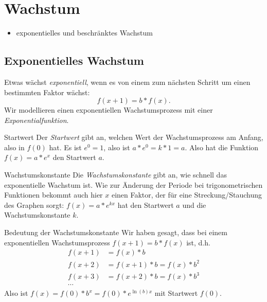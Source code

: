 \chapter{Wachstum}
\begin{inhalt}
  \begin{itemize}
    \item exponentielles und beschränktes Wachstum
  \end{itemize}
\end{inhalt}

\section{Exponentielles Wachstum}

Etwas wächst \emph{exponentiell}, wenn es von einem zum nächsten Schritt um einen bestimmten Faktor wächst:
\begin{equation*}
  f(x+1)=b*f(x).
\end{equation*}
Wir modellieren einen exponentiellen Wachstumsprozess mit einer \emph{Exponentialfunktion}.

\begin{bla}{Startwert}
  Der \emph{Startwert} gibt an, welchen Wert der Wachstumsprozess am Anfang, also in $f(0)$ hat. Es ist $e^0=1$, also ist $a*e^0=k*1=a$. Also hat die Funktion $f(x)=a*e^x$ den Startwert $a$.
\end{bla}

\begin{bla}{Wachstumskonstante}
  Die \emph{Wachstumskonstante} gibt an, wie schnell das exponentielle Wachstum ist. Wie zur Änderung der Periode bei trigonometrischen Funktionen bekommt auch hier $x$ einen Faktor, der für eine Streckung/Stauchung des Graphen sorgt: $f(x)=a*e^{kx}$ hat den Startwert $a$ und die Wachstumskonstante $k$.
\end{bla}

\begin{bla}{Bedeutung der Wachstumskonstante}
  Wir haben gesagt, dass bei einem exponentiellen Wachstumsprozess $f(x+1)=b*f(x)$ ist, d.h.
  \begin{align*}
    f(x+1) &= f(x)*b \\
    f(x+2) &= f(x+1)*b = f(x)*b^2 \\
    f(x+3) &= f(x+2)*b = f(x)*b^3 \\
    \cdots
  \end{align*}
  Also ist $f(x)=f(0)*b^x=f(0)*e^{\ln(b)x}$ mit Startwert $f(0)$.
\end{bla}

